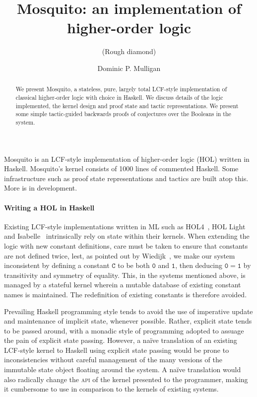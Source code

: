 \documentclass{llncs}
\author{Dominic P. Mulligan}
\title{Mosquito: an implementation of higher-order logic}
\subtitle{(Rough diamond)}
\institute{Computer Laboratory, University of Cambridge}
\newcommand{\mosquito}{Mosquito\xspace}
\begin{document}
\maketitle

\begin{abstract}
We present \mosquito, a stateless, pure, largely total LCF-style implementation of classical higher-order logic with choice in Haskell.
We discuss details of the logic implemented, the kernel design and proof state and tactic representations.
We present some simple tactic-guided backwards proofs of conjectures over the Booleans in the system.
\end{abstract}

\mosquito is an LCF-style implementation of higher-order logic (HOL) written in Haskell.
\mosquito's kernel consists of 1000 lines of commented Haskell.
Some infrastructure such as proof state representations and tactics are built atop this.
More is in development.
\paragraph{Writing a HOL in Haskell}
Existing LCF-style implementations written in ML such as HOL4~\cite{gordon:introduction:1993}, HOL Light~\cite{harrison:hol:2009} and Isabelle~\cite{wenzel:isabelle:2008} intrinsically rely on state within their kernels.
When extending the logic with new constant definitions, care must be taken to ensure that constants are not defined twice, lest, as pointed out by Wiedijk~\cite{wiedijk:stateless:2011}, we make our system inconsistent by defining a constant $\mathtt{C}$ to be both $\mathtt{0}$ and $\mathtt{1}$, then deducing $\mathtt{0 = 1}$ by transitivity and symmetry of equality.
This, in the systems mentioned above, is managed by a stateful kernel wherein a mutable database of existing constant names is maintained.
The redefinition of existing constants is therefore avoided.

Prevailing Haskell programming style tends to avoid the use of imperative update and maintenance of implicit state, whenever possible.
Rather, explicit state tends to be passed around, with a monadic style of programming adopted to assuage the pain of explicit state passing.
However, a na\"ive translation of an existing LCF-style kernel to Haskell using explicit state passing would be prone to inconsistencies without careful management of the many versions of the immutable state object floating around the system.
A na\"ive translation would also radically change the \textsc{api} of the kernel presented to the programmer, making it cumbersome to use in comparison to the kernels of existing systems.
\end{document}
